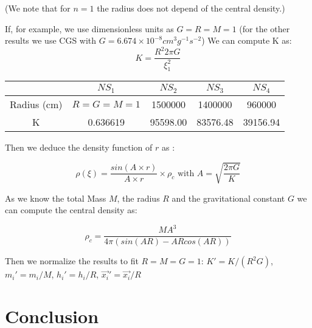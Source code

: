 (We note that for $n=1$ the radius does not depend of the central density.)

If, for example, we use dimensionless units as $G=R=M=1$ (for the other results we use CGS with $G = 6.674 \times 10^{-8} cm^3g^{-1}s^{-2}$) 
We can compute K as: 
\begin{equation}
\label{eq:constant}
K = \frac{R^2  2 \pi G}{\xi_1^2}
\end{equation}

\begin{center}

\begin{tabular}{c|c|c|c|c|}
 & $NS_1$ & $NS_2$ & $NS_3$ & $NS_4$ \\ 
\hline 
Radius (cm) & $R=G=M=1$ & 1500000 & 1400000 & 960000 \\ 
\hline 
K & 0.636619 & 95598.00 & 83576.48 & 39156.94\\ 
\hline 
\end{tabular}

\end{center} 

Then we deduce the density function of $r$ as :

$$\rho(\xi) = \frac{sin(A\times r)}{A \times r} \times \rho_c \mbox{ with } A = \sqrt{\frac{2\pi G}{K}}
$$

As we know the total Mass $M$, the radius $R$ and the gravitational constant $G$ we can compute the central density as: 

$$ \rho_c = \frac{M A^3}{4 \pi (sin(AR)-ARcos(AR)) } $$

Then we normalize the results to fit $R = M = G = 1$: $K' = K/(R^2G) $, $m_i' = m_i/M $, $h_i' = h_i / R$, $\vec{x_i}' = \vec{x_i}/R$ 

\section{Conclusion}
